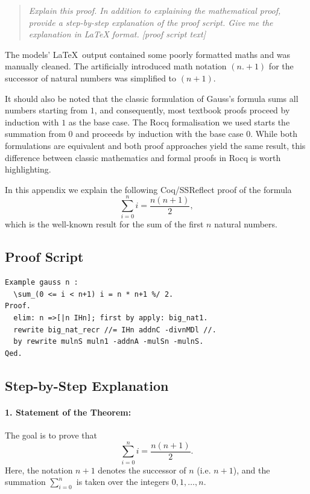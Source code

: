 \documentclass[10pt,nonacm,natbib=false]{acmart}
\begin{document}
\begin{quotation}
  \textit{Explain this proof. In addition to explaining the
    mathematical proof, provide a step-by-step explanation of the
    proof script. Give me the explanation in LaTeX format. [proof script text]}

\end{quotation}

\noindent The models' \LaTeX\ output contained some poorly formatted
maths and was manually cleaned. The artificially introduced math
notation $(n.+1)$ for the successor of natural numbers was simplified
to $(n+1)$.

It should also be noted that the classic formulation of Gauss's
formula sums all numbers starting from $1$, and consequently, most
textbook proofs proceed by induction with $1$ as the base case. The
Rocq formalisation we used starts the summation from $0$ and proceeds
by induction with the base case $0$. While both formulations are
equivalent and both proof approaches yield the same result, this
difference between classic mathematics and formal proofs in Rocq is
worth highlighting.

\noindent\hdashrule[0.5ex]{\textwidth}{1pt}{1pt}

In this appendix we explain the following Coq/SSReflect proof of the formula
\[
\sum_{i=0}^ {n} i = \frac{n(n+1)}{2},
\]
which is the well-known result for the sum of the first \( n \) natural numbers.

\subsection*{Proof Script}
\begin{lstlisting}
Example gauss n :
  \sum_(0 <= i < n+1) i = n * n+1 %/ 2.
Proof.
  elim: n =>[|n IHn]; first by apply: big_nat1.
  rewrite big_nat_recr //= IHn addnC -divnMDl //.
  by rewrite mulnS muln1 -addnA -mulSn -mulnS.
Qed.
\end{lstlisting}

\subsection*{Step-by-Step Explanation}

\paragraph{1. Statement of the Theorem:}
The goal is to prove that
\[
\sum_{i=0}^{n} i = \frac{n(n+1)}{2}.  
\]
Here, the notation \( n+1 \) denotes the successor of \( n \) (i.e. \( n+1 \)), and the summation \(\sum_{i=0}^{n}\) is taken over the integers \( 0, 1, \dots, n \).
\end{document}
